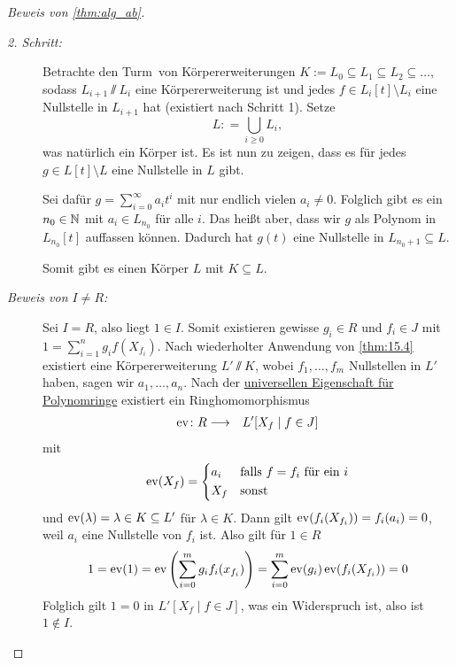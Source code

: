 \documentclass[12pt,a4paper]{scrartcl}
\begin{document}
\begin{proof}[Beweis von \cref{thm:alg_ab}]
\begin{description}
		\item[\emph{2. Schritt:}] Betrachte den \glqq Turm\grqq\ von Körpererweiterungen $K := L_0\subseteq L_1\subseteq L_2\subseteq\dots$, sodass $L_{i+1}\sslash L_{i}$ eine Körpererweiterung ist und jedes $f\in L_i[t]\setminus L_i$ eine Nullstelle in $L_{i+1}$ hat (existiert nach Schritt 1). Setze
		\[L : = \bigcup\limits_{i\geq 0} L_i, \]
		was natürlich ein Körper ist. Es ist nun zu zeigen, dass es für jedes $g\in L[t]\setminus L$ eine Nullstelle in $L$ gibt.
		
		Sei dafür $g = \sum_{i = 0}^{\infty}a_it^i$ mit nur endlich vielen $a_i\neq 0$. Folglich gibt es ein $n_0\in\mathbb N$ mit $a_i\in L_{n_0}$ für alle $i$. Das heißt aber, dass wir $g$ als Polynom in $L_{n_0}[t]$ auffassen können. Dadurch hat $g(t)$ eine Nullstelle in $L_{n_0+1}\subseteq L$.
		
		Somit gibt es einen Körper $L$ mit $K\subseteq L$.
		\item[\emph{Beweis von $I\neq R$:}] Sei $I = R$, also liegt $1\in I$. Somit existieren gewisse $g_i\in R$ und $f_i\in J$ mit $1 = \sum_{i =1}^{n}g_if(X_{f_i})$. Nach wiederholter Anwendung von \cref{thm:15.4} existiert eine Körpererweiterung $L'\sslash K$, wobei $f_1,\dots, f_m$ Nullstellen in $L'$ haben, sagen wir $a_1,\dots, a_n$. Nach der \hyperref[thm:unieig_polyring]{universellen Eigenschaft für Polynomringe} existiert ein Ringhomomorphismus
		\begin{eqnarray*}
			\operatorname{ev}\colon R & \longrightarrow & L'[X_f\mid f\in J]
		\end{eqnarray*}
		mit \[\ev(X_f) = \begin{cases*} a_i & falls $f=f_i$ für ein $i$\\
		X_f & sonst
		\end{cases*}\]							
		und $\operatorname{ev}(\lambda)  = \lambda\in K\subseteq L'$ für $\lambda\in K$. Dann gilt $\operatorname{ev}(f_i(X_{f_i})) = f_i(a_i) = 0$, weil $a_i$ eine Nullstelle von $f_i$ ist. Also gilt für $1\in R$ 
		\[1 = \operatorname{ev}(1) = \operatorname{ev}\left(\sum_{i = 0}^{m}g_if_i(x_{f_i})\right) = \sum_{i = 0}^m\operatorname{ev}(g_i)\operatorname{ev}(f_i(X_{f_i})) = 0\]
		Folglich gilt $1 = 0$ in $L'[X_f\mid f\in J]$, was ein Widerspruch ist, also ist $1\notin I$.
  \qedhere
	\end{description}
\end{proof}
	
\end{document}

